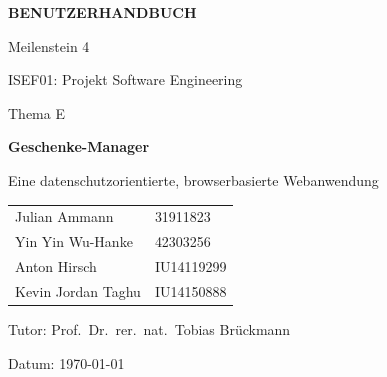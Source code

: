 \documentclass[11pt,a4paper]{article}
\begin{document}
\begin{titlepage}
\thispagestyle{empty}
\centering
\vspace*{2.5cm}

{\Huge\bfseries BENUTZERHANDBUCH\par}
\vspace{0.6cm}
{\Large Meilenstein 4\par}
\vspace{1.2cm}

{\Large ISEF01: Projekt Software Engineering\par}
\vspace{1.5cm}

{\large Thema E\par}
\vspace{0.2cm}
{\Large\bfseries Geschenke-Manager\par}
\vspace{0.3cm}
{\large Eine datenschutzorientierte, browserbasierte Webanwendung\par}

\vfill

{\large
\begin{tabular}{@{}ll@{}}
Julian Ammann & 31911823 \\
Yin Yin Wu-Hanke & 42303256 \\
Anton Hirsch & IU14119299 \\
Kevin Jordan Taghu & IU14150888 \\
\end{tabular}\par}

\vspace{1.0cm}
{\large
Tutor: Prof.\ Dr.\ rer.\ nat.\ Tobias Brückmann\par
Datum: \today %
\par}

\end{titlepage}

\setcounter{page}{1}

\tableofcontents

\clearpage
{}
\listoffigures

\clearpage
{}

\end{document}
